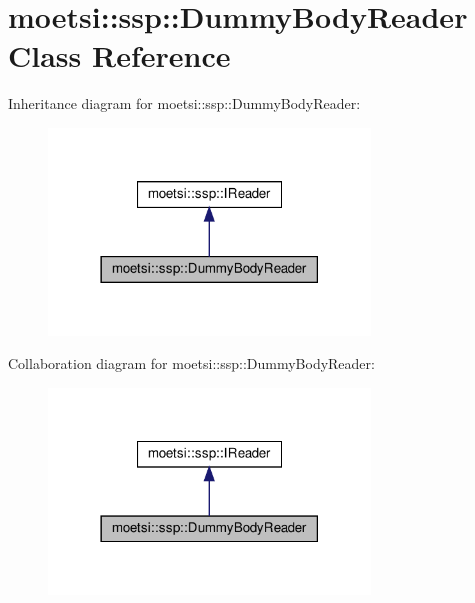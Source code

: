 \hypertarget{classmoetsi_1_1ssp_1_1DummyBodyReader}{}\section{moetsi\+:\+:ssp\+:\+:Dummy\+Body\+Reader Class Reference}
\label{classmoetsi_1_1ssp_1_1DummyBodyReader}


Inheritance diagram for moetsi\+:\+:ssp\+:\+:Dummy\+Body\+Reader\+:
\nopagebreak
\begin{figure}[H]
\begin{center}
\leavevmode
\includegraphics[width=242pt]{classmoetsi_1_1ssp_1_1DummyBodyReader__inherit__graph}
\end{center}
\end{figure}


Collaboration diagram for moetsi\+:\+:ssp\+:\+:Dummy\+Body\+Reader\+:
\nopagebreak
\begin{figure}[H]
\begin{center}
\leavevmode
\includegraphics[width=242pt]{classmoetsi_1_1ssp_1_1DummyBodyReader__coll__graph}
\end{center}
\end{figure}
